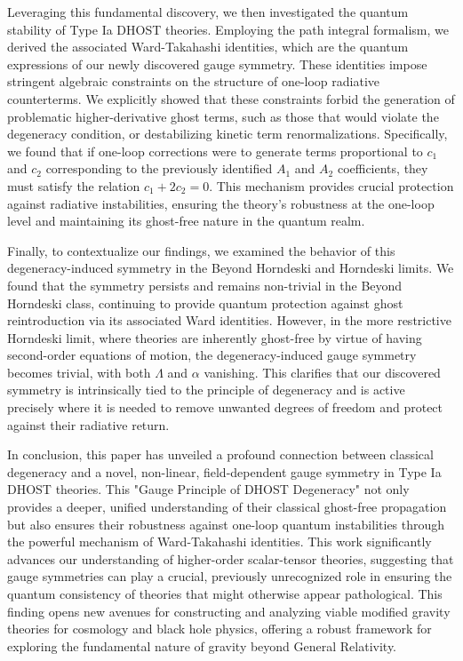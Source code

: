 \documentclass[twocolumn]{aastex631}
\begin{document}
Leveraging this fundamental discovery, we then investigated the quantum stability of Type Ia DHOST theories. Employing the path integral formalism, we derived the associated Ward-Takahashi identities, which are the quantum expressions of our newly discovered gauge symmetry. These identities impose stringent algebraic constraints on the structure of one-loop radiative counterterms. We explicitly showed that these constraints forbid the generation of problematic higher-derivative ghost terms, such as those that would violate the degeneracy condition, or destabilizing kinetic term renormalizations. Specifically, we found that if one-loop corrections were to generate terms proportional to $c_1$ and $c_2$ corresponding to the previously identified $A_1$ and $A_2$ coefficients, they must satisfy the relation $c_1 + 2c_2 = 0$. This mechanism provides crucial protection against radiative instabilities, ensuring the theory's robustness at the one-loop level and maintaining its ghost-free nature in the quantum realm.

Finally, to contextualize our findings, we examined the behavior of this degeneracy-induced symmetry in the Beyond Horndeski and Horndeski limits. We found that the symmetry persists and remains non-trivial in the Beyond Horndeski class, continuing to provide quantum protection against ghost reintroduction via its associated Ward identities. However, in the more restrictive Horndeski limit, where theories are inherently ghost-free by virtue of having second-order equations of motion, the degeneracy-induced gauge symmetry becomes trivial, with both $\Lambda$ and $\alpha$ vanishing. This clarifies that our discovered symmetry is intrinsically tied to the principle of degeneracy and is active precisely where it is needed to remove unwanted degrees of freedom and protect against their radiative return.

In conclusion, this paper has unveiled a profound connection between classical degeneracy and a novel, non-linear, field-dependent gauge symmetry in Type Ia DHOST theories. This "Gauge Principle of DHOST Degeneracy" not only provides a deeper, unified understanding of their classical ghost-free propagation but also ensures their robustness against one-loop quantum instabilities through the powerful mechanism of Ward-Takahashi identities. This work significantly advances our understanding of higher-order scalar-tensor theories, suggesting that gauge symmetries can play a crucial, previously unrecognized role in ensuring the quantum consistency of theories that might otherwise appear pathological. This finding opens new avenues for constructing and analyzing viable modified gravity theories for cosmology and black hole physics, offering a robust framework for exploring the fundamental nature of gravity beyond General Relativity.
\end{document}
